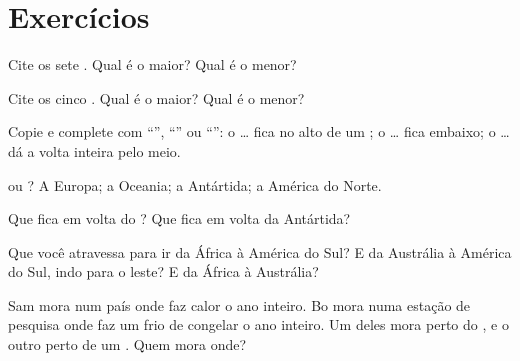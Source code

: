 \section{Exercícios}

\begin{exercise}[$\star$]\label{exo:g3:continents-and-oceans:1}
Cite os sete . Qual é o maior? Qual é o menor?
\end{exercise}

\begin{exercise}[$\star$]\label{exo:g3:continents-and-oceans:2}
Cite os cinco . Qual é o maior? Qual é o menor?
\end{exercise}

\begin{exercise}[$\star$]\label{exo:g3:continents-and-oceans:3}
Copie e complete com ``'', ``'' ou ``'': o
\dots{} fica no alto de um ; o \dots{} fica embaixo; o \dots{} dá a
volta inteira pelo meio.
\end{exercise}

\begin{exercise}[$\star$]\label{exo:g3:continents-and-oceans:4}
 ou ? A Europa; a Oceania; a Antártida; a
América do Norte.
\end{exercise}

\begin{exercise}[$\star$]\label{exo:g3:continents-and-oceans:5}
Que  fica em volta do ? Que  fica em volta da
Antártida?
\end{exercise}

\begin{exercise}[$\star\star$]\label{exo:g3:continents-and-oceans:6}
Que  você atravessa para ir da África à América do Sul? E da
Austrália à América do Sul, indo para o leste? E da África à Austrália?
\end{exercise}

\begin{exercise}[$\star\star$]\label{exo:g3:continents-and-oceans:7}
Sam mora num país onde faz calor o ano inteiro. Bo mora numa estação de
pesquisa onde faz um frio de congelar o ano inteiro. Um deles mora perto
do , e o outro perto de um . Quem mora onde?
\end{exercise}

